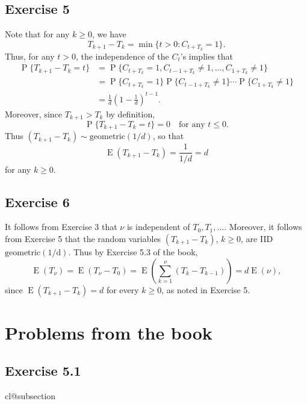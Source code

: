 \documentclass[12pt]{article}
\makeatletter
\def\nullstepcounter#1{%
	\begingroup
		\let\@elt\@stpelt
		\csname cl@#1\endcsname
	\endgroup}
\DeclareMathOperator{\E}{E}
\DeclareMathOperator{\Prob}{P}
\makeatother
\begin{document}
\subsection*{Exercise 5}

Note that for any $k \geq 0$, we have
\begin{equation*}
T_{k+1} - T_k = \min\{t > 0 : C_{t+T_k} = 1\}.
\end{equation*}
Thus, for any $t > 0$, the independence of the $C_t$'s implies that
\begin{align*}
\Prob\{T_{k+1} - T_k = t\} &= \Prob\{C_{t+T_k} = 1, C_{t-1+T_k} \neq 1, \ldots, C_{1+T_k} \neq 1\} \\
&= \Prob\{C_{t+T_k} = 1\} \Prob\{C_{t-1+T_k} \neq 1\} \cdots \Prob\{C_{1+T_k} \neq 1\} \\
&= \frac{1}{d}\left(1 - \frac{1}{d}\right)^{t-1}.
\end{align*}
Moreover, since $T_{k+1} > T_k$ by definition,
\begin{equation*}
\Prob\{T_{k+1} - T_k = t\} = 0 \quad \text{for any $t \leq 0$}.
\end{equation*}
Thus $(T_{k+1} - T_k) \sim \mathrm{geometric}(1/d)$, so that
\begin{equation*}
\E(T_{k+1} - T_k) = \frac{1}{1/d} = d
\end{equation*}
for any $k \geq 0$.

\subsection*{Exercise 6}

It follows from Exercise 3 that $\nu$ is independent of $T_0, T_1, \ldots$. Moreover, it follows from Exercise 5 that the random variables $(T_{k+1} - T_k)$, $k \geq 0$, are IID $\mathrm{geometric(1/d)}$. Thus by Exercise 5.3 of the book,
\begin{equation*}
\E(T_\nu) = \E(T_\nu - T_0) = \E\left(\sum_{k=1}^\nu (T_k - T_{k-1})\right) = d\E(\nu),
\end{equation*}
since $\E(T_{k+1} - T_k) = d$ for every $k \geq 0$, as noted in Exercise 5.

\section*{Problems from the book}

\subsection*{Exercise 5.1}
\nullstepcounter{subsection}
\end{document}
